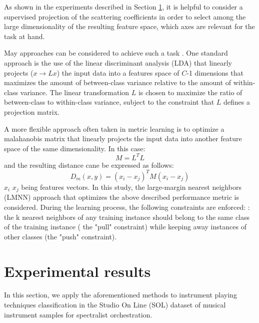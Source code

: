 \documentclass{article}
\begin{document}
As shown in the experiments described in Section \ref{sec:exp}, it is helpful to consider a supervised projection of the scattering coefficients in order to select among the large dimensionality of the resulting feature space, which axes are relevant for the task at hand.

May approaches can be considered to achieve such a task \cite{}. One standard approach is the use of the linear discriminant analysis (LDA) that linearly projects ($x \rightarrow L x$) the input data into a features space of $C$-1 dimensions that maximizes the amount of between-class variance
relative to the amount of within-class variance. The linear transformation $L$ is chosen to maximize the ratio of between-class to within-class variance,
subject to the constraint that $L$ defines a projection matrix.


A more flexible approach often taken in metric learning \cite{bellet2013survey} is to optimize a malahanobis matrix that linearly projects the input data into another feature space of the same dimensionality. In this case:
\begin{equation}
  M=L^T L
\end{equation}
and the resulting distance cane be expressed as follows:
\begin{equation}
  D_m(x, y) = (x_i-x_j)^T M(x_i-x_j)
\end{equation}
$x_i$ $x_j$ being features vectors. In this study, the large-margin nearest neighbors (LMNN) approach \cite{weinberger2006nips, weinberger2009jmlr} that optimizes the above described performance metric is considered. During the learning process, the following constraints are enforced: : the
k nearest neighbors of any training instance should belong to the
same class of the training instance ( the "pull" constraint) while keeping away instances of other classes (the "push" constraint).




\section{Experimental results} \label{sec:exp}
In this section, we apply the aforementioned methods to instrument playing techniques classification in the Studio On Line (SOL) dataset of musical instrument samples for spectralist orchestration.
\end{document}
